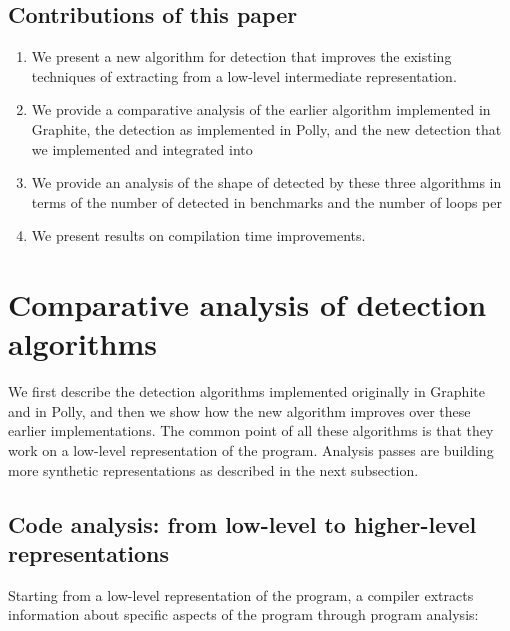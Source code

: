 \documentclass{sig-alternate}
\begin{document}
\subsection{Contributions of this paper}
\begin{enumerate}
  \item We present a new algorithm for \SCoP{} detection that improves the
    existing techniques of extracting  from a low-level intermediate
    representation.
  \item We provide a comparative analysis of the earlier algorithm implemented
    in Graphite, the \SCoP{} detection as implemented in \LLVM{-}Polly, and the new
    \SCoP{} detection that we implemented and integrated into 
  \item We provide an analysis of the shape of  detected by these three
    algorithms in terms of the number of  detected in benchmarks and the
    number of loops per 
  \item We present results on compilation time improvements.
\end{enumerate}

\section{Comparative analysis of \SCoP{} detection algorithms}

We first describe the \SCoP{} detection algorithms implemented originally in
Graphite and in Polly, and then we show how the new algorithm improves over
these earlier implementations.  The common point of all these algorithms is that
they work on a low-level representation of the program.  Analysis passes are
building more synthetic representations as described in the next subsection.

\subsection{Code analysis: from low-level to higher-level representations}

Starting from a low-level representation of the program, a compiler extracts
information about specific aspects of the program through program analysis:
\end{document}
